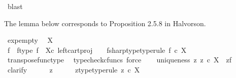 \begin{isabellebody}
\ blast\isanewline
{}\isamarkupfalse%
%
\endisatagproof
{\isafoldproof}%
%
\isadelimproof
%
\endisadelimproof
%
\begin{isamarkuptext}%
The lemma below corresponds to Proposition 2.5.8 in Halvorson.%
\end{isamarkuptext}\isamarkuptrue%
\isamarkupfalse%
\ exp{\isacharunderscore}{\kern0pt}empty{\isacharcolon}{\kern0pt}\isanewline
\ \ {\isachardoublequoteopen}X\isactrlbsup {\isasymemptyset}\isactrlesup \ {\isasymcong}\ {\isasymone}{\isachardoublequoteclose}\isanewline
%
\isadelimproof
%
\endisadelimproof
%
\isatagproof
{}\isamarkupfalse%
\ {\isacharminus}{\kern0pt}\ \isanewline
\ \ \isamarkupfalse%
\ f\ \ f{\isacharunderscore}{\kern0pt}type{\isacharcolon}{\kern0pt}\ {\isachardoublequoteopen}f\ {\isacharequal}{\kern0pt}\ {\isasymalpha}\isactrlbsub X\isactrlesub {\isasymcirc}\isactrlsub c\ {\isacharparenleft}{\kern0pt}left{\isacharunderscore}{\kern0pt}cart{\isacharunderscore}{\kern0pt}proj\ {\isasymemptyset}\ {\isasymone}{\isacharparenright}{\kern0pt}{\isachardoublequoteclose}\ \ fsharp{\isacharunderscore}{\kern0pt}type{\isacharbrackleft}{\kern0pt}type{\isacharunderscore}{\kern0pt}rule{\isacharbrackright}{\kern0pt}{\isacharcolon}{\kern0pt}\ {\isachardoublequoteopen}f\isactrlsup {\isasymsharp}\ {\isasymin}\isactrlsub c\ X\isactrlbsup {\isasymemptyset}\isactrlesup {\isachardoublequoteclose}\isanewline
\ \ \ \ \isamarkupfalse%
\ transpose{\isacharunderscore}{\kern0pt}func{\isacharunderscore}{\kern0pt}type\ \isamarkupfalse%
\ {\isacharparenleft}{\kern0pt}typecheck{\isacharunderscore}{\kern0pt}cfuncs{\isacharcomma}{\kern0pt}\ force{\isacharparenright}{\kern0pt}\isanewline
\ \ \isamarkupfalse%
\ uniqueness{\isacharcolon}{\kern0pt}\ {\isachardoublequoteopen}{\isasymforall}z{\isachardot}{\kern0pt}\ z\ {\isasymin}\isactrlsub c\ X\isactrlbsup {\isasymemptyset}\isactrlesup \ {\isasymlongrightarrow}\ z{\isacharequal}{\kern0pt}f\isactrlsup {\isasymsharp}{\isachardoublequoteclose}\isanewline
\ \ \isamarkupfalse%
\ clarify\isanewline
\ \ \ \ \isamarkupfalse%
\ z\isanewline
\ \ \ \ \isamarkupfalse%
\ z{\isacharunderscore}{\kern0pt}type{\isacharbrackleft}{\kern0pt}type{\isacharunderscore}{\kern0pt}rule{\isacharbrackright}{\kern0pt}{\isacharcolon}{\kern0pt}\ {\isachardoublequoteopen}z\ {\isasymin}\isactrlsub c\ X\isactrlbsup {\isasymemptyset}\isactrlesup {\isachardoublequoteclose}\isanewline
\ \ \ \ \isamarkupfalse%

\end{isabellebody}
